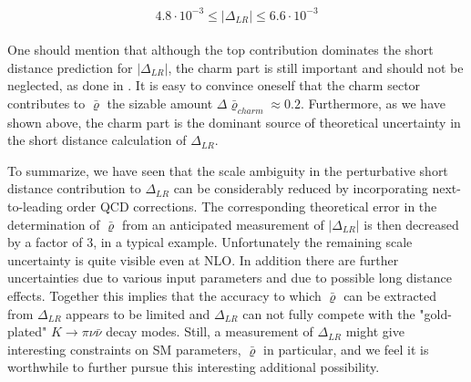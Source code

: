 \begin{equation}\label{dlr2}
4.8\cdot 10^{-3}\leq |\Delta_{LR}|\leq 6.6\cdot 10^{-3}   
\end{equation}
\\
One should mention that although the top contribution dominates the
short distance prediction for $|\Delta_{LR}|$, the charm part is still
important and should not be neglected, as done in
\cite{belangeretal:93}.  It is easy to convince oneself that the charm
sector contributes to $\bar\varrho$ the sizable amount
$\Delta\bar\varrho_{charm}\approx 0.2$.  Furthermore, as we have shown
above, the charm part is the dominant source of theoretical uncertainty
in the short distance calculation of $\Delta_{LR}$.

To summarize, we have seen that the scale ambiguity in the
perturbative short distance contribution to $\Delta_{LR}$ can be
considerably reduced by incorporating next-to-leading order QCD
corrections. The corresponding theoretical error in the
determination of $\bar\varrho$ from an anticipated measurement
of $|\Delta_{LR}|$ is then decreased by a factor of 3, in a typical
example. Unfortunately the remaining scale uncertainty is quite
visible even at NLO. In addition there are further uncertainties due to
various input parameters and due to possible long distance effects.
Together this implies that the accuracy to which $\bar\varrho$ can be
extracted from $\Delta_{LR}$ appears to be limited and $\Delta_{LR}$
can not fully compete with the "gold-plated" $K\to\pi\nu\bar\nu$
decay modes. Still, a measurement of $\Delta_{LR}$ might give
interesting constraints on SM parameters, $\bar\varrho$ in particular,
and we feel it is worthwhile to further pursue this interesting
additional possibility.
